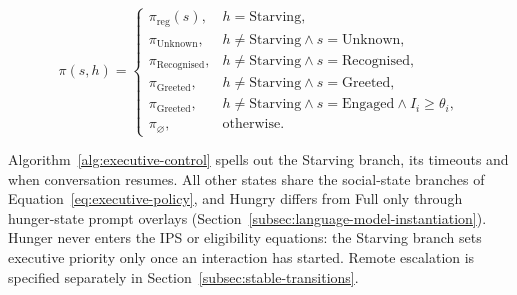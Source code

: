 \begin{equation}
    \pi(s,h)=
    \begin{cases}
        \pi_{\mathrm{reg}}(s), & h=\mathrm{Starving},\\
        \pi_{\mathrm{Unknown}}, & h\neq\mathrm{Starving}\land s=\mathrm{Unknown},\\
        \pi_{\mathrm{Recognised}}, & h\neq\mathrm{Starving}\land s=\mathrm{Recognised},\\
        \pi_{\mathrm{Greeted}}, & h\neq\mathrm{Starving}\land s=\mathrm{Greeted},\\
        \pi_{\mathrm{Greeted}}, & h\neq\mathrm{Starving}\land s=\mathrm{Engaged}\land I_i\geq\theta_i,\\
        \pi_{\varnothing}, & \text{otherwise}.
    \end{cases}
    \label{eq:executive-policy}
\end{equation}

Algorithm~\ref{alg:executive-control} spells out the Starving branch, its timeouts and when conversation resumes. All other states share the social-state branches of Equation~\ref{eq:executive-policy}, and Hungry differs from Full only through hunger-state prompt overlays (Section~\ref{subsec:language-model-instantiation}). Hunger never enters the IPS or eligibility equations: the Starving branch sets executive priority only once an interaction has started. Remote escalation is specified separately in Section~\ref{subsec:stable-transitions}.

